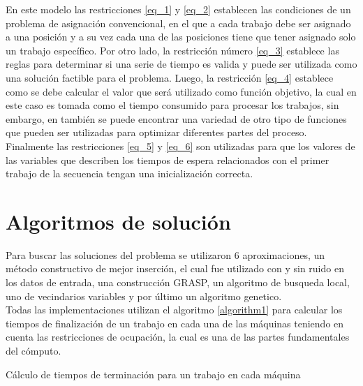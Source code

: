 \documentclass[10pt, twoside]{article}
\begin{document}
En este modelo las restricciones \ref{eq_1} y \ref{eq_2} establecen las condiciones
de un problema de asignación convencional, en el que a cada trabajo debe ser
asignado a una posición y a su vez cada una de las posiciones tiene que tener
asignado solo un trabajo específico. Por otro lado, la restricción número \ref{eq_3}
establece las reglas para determinar si una serie de tiempo es valida y puede
ser utilizada como una solución factible para el problema. Luego, la restricción
\ref{eq_4} establece como se debe calcular el valor que será utilizado
como función objetivo, la cual en este caso es tomada como el tiempo consumido para
procesar los trabajos, sin embargo, en \cite{model} también se puede encontrar
una variedad de otro tipo de funciones que pueden ser utilizadas para optimizar
diferentes partes del proceso. Finalmente las restricciones \ref{eq_5} y \ref{eq_6}
son utilizadas para que los valores de las variables que describen los tiempos
de espera relacionados con el primer trabajo de la secuencia tengan una
inicialización correcta.\\

\section{Algoritmos de solución}

Para buscar las soluciones del problema se utilizaron 6 aproximaciones, un
método constructivo de mejor inserción, el cual fue utilizado con y sin
ruido en los datos de entrada, una construcción GRASP, un algoritmo de busqueda
local, uno de vecindarios variables y por último un algoritmo genetico.\\

Todas las implementaciones utilizan el algoritmo \ref{algorithm1} para calcular
los tiempos de finalización de un trabajo en cada una de las máquinas teniendo
en cuenta las restricciones de ocupación, la cual es una de las partes
fundamentales del cómputo.\\

\begin{algorithm}[H]
    \caption{Cálculo de tiempos de terminación para un trabajo en cada máquina}
    \label{algorithm1}
\end{algorithm}

\vspace{0.5cm}
\end{document}
